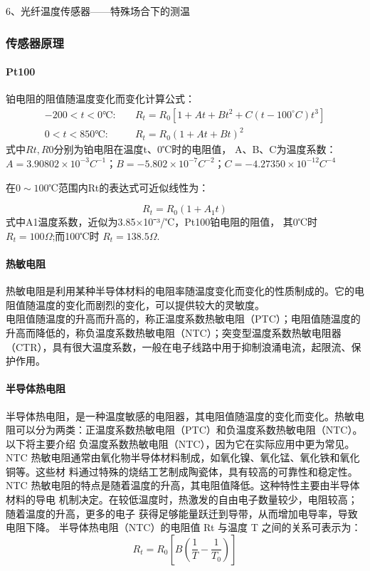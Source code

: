 \documentclass[a4paper]{../phyreport}
\begin{document}
6、光纤温度传感器——特殊场合下的测温


\subsubsection{传感器原理}

\paragraph{Pt100} 铂电阻的阻值随温度变化而变化计算公式：
\begin{align}
  \label{eq:2}
-200<t<0 ℃ :& \quad {R_t} = {R_0}\left[ {1 + At + B{t^2} + C(t - 100^\circ C){t^3}} \right]\\
0<t<850 ℃ :& \quad R_t=R_0(1+At+Bt)^2 
\end{align}
式中$Rt,R0$分别为铂电阻在温度t、0℃时的电阻值，
A、B、C为温度系数：
$A=3.90802×10^{-3}C^{-1}；B=-5.802×10^{-7}C^{-2} ；C=-4.27350×10^{-12}C^{-4}$

在$0 \sim 100$℃范围内Rt的表达式可近似线性为：

\begin{equation}
\label{eq:1}
R_t=R_0(1+A_1t)
\end{equation}
式中A1温度系数，近似为3.85×10ˉ³/℃，Pt100铂电阻的阻值， 其0℃时 $R_t =100\Omega$;而100℃时 $R_t =138.5Ω$.

\paragraph{热敏电阻}
热敏电阻是利用某种半导体材料的电阻率随温度变化而变化的性质制成的。它的电阻值随温度的变化而剧烈的变化，可以提供较大的灵敏度。\\
电阻值随温度的升高而升高的，称正温度系数热敏电阻（PTC）；电阻值随温度的升高而降低的，称负温度系数热敏电阻（NTC）；突变型温度系数热敏电阻器（CTR），具有很大温度系数，一般在电子线路中用于抑制浪涌电流，起限流、保护作用。

\paragraph{半导体热电阻}
半导体热电阻，是一种温度敏感的电阻器，其电阻值随温度的变化而变化。热敏电
阻可以分为两类：正温度系数热敏电阻（PTC）和负温度系数热敏电阻（NTC）。以下将主要介绍
负温度系数热敏电阻（NTC），因为它在实际应用中更为常见。
NTC 热敏电阻通常由氧化物半导体材料制成，如氧化镍、氧化锰、氧化铁和氧化铜等。这些材
料通过特殊的烧结工艺制成陶瓷体，具有较高的可靠性和稳定性。
NTC 热敏电阻的特点是随着温度的升高，其电阻值降低。这种特性主要由半导体材料的导电
机制决定。在较低温度时，热激发的自由电子数量较少，电阻较高；随着温度的升高，更多的电子
获得足够能量跃迁到导带，从而增加电导率，导致电阻下降。
半导体热电阻（NTC）的电阻值 Rt 与温度 T 之间的关系可表示为：
\begin{equation}
\label{eq:3}
R_t=R_0 \left[ B \left( \frac{1}{T}-\frac{1}{T_0} \right) \right]
\end{equation}
\end{document}
